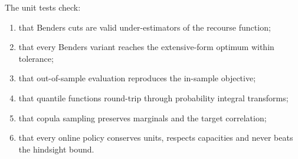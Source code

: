 The unit tests check:
\begin{enumerate}
  \item that Benders cuts are valid under-estimators of the recourse function;
  \item that every Benders variant reaches the extensive-form optimum within tolerance;
  \item that out-of-sample evaluation reproduces the in-sample objective;
  \item that quantile functions round-trip through probability integral transforms;
  \item that copula sampling preserves marginals and the target correlation;
  \item that every online policy conserves units, respects capacities and never beats the hindsight bound.
\end{enumerate}
